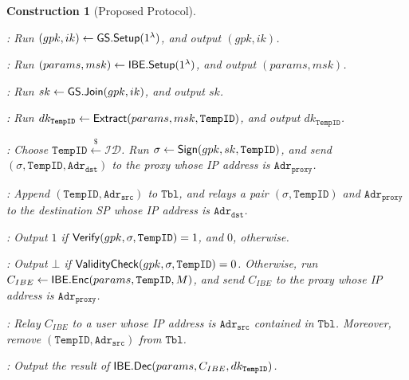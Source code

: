 \documentclass[preprint]{sig-alternate}
\newtheorem{con}{Construction}[section]
\begin{document}
\begin{con}[Proposed Protocol]~
\begin{description}
\setlength{\itemsep}{0em}\setlength{\parsep}{0em}
\item[${\sf GM.Setup}$]: Run $(gpk,ik)\leftarrow{\sf GS.Setup}(1^\lambda)$, and output $(gpk,\allowbreak ik)$. 

\item[${\sf KGC.Setup}$]: Run $(params,msk)\leftarrow{\sf IBE.Setup}(1^\lambda)$, and output $(params,msk)$. 

\item[${\sf Join}$]: Run $sk\leftarrow {\sf GS.Join}(gpk,ik)$, and output $sk$. 

\item[${\sf UserKeyGen}$]: Run $dk_{\mathtt{TempID}}\leftarrow{\sf Extract}(params,msk,\mathtt{TempID})$, 
and output $dk_{\mathtt{TempID}}$. 

\item[${\sf SendRequest}$]: Choose $\mathtt{TempID}\stackrel{\$}{\leftarrow} \mathcal{ID}$. Run $\sigma\leftarrow {\sf Sign}(gpk,sk,\allowbreak \mathtt{TempID})$, and send $(\sigma,\mathtt{TempID},\mathtt{Adr_{dst}})$ to the proxy whose IP address is $\mathtt{Adr_{proxy}}$. 

\item[${\sf RelayRequest}$]: Append $(\mathtt{TempID},\mathtt{Adr_{src}})$ to $\mathtt{Tbl}$, and relays a pair $(\sigma,\mathtt{TempID})$ and $\mathtt{Adr_{proxy}}$ to the destination SP whose IP address is $\mathtt{Adr_{dst}}$. 

\item[${\sf ValidityCheck}$]: Output $1$ if ${\sf Verify}(gpk,\sigma,\mathtt{TempID})=1$, and $0$, otherwise. 

\item[${\sf SendContent}$]: Output $\bot$ if ${\sf ValidityCheck}(gpk,\sigma,\mathtt{TempID})=0$. Otherwise, run $C_{IBE}\leftarrow {\sf IBE.Enc}(params,\mathtt{TempID},\allowbreak M)$, and send $C_{IBE}$ to the proxy whose IP address is $\mathtt{Adr_{proxy}}$. 

\item[${\sf RelayContent}$]: Relay $C_{IBE}$ to a user whose IP address is $\mathtt{Adr_{src}}$ contained in $\mathtt{Tbl}$. Moreover, remove $(\mathtt{TempID}, \allowbreak \mathtt{Adr_{src}})$ from $\mathtt{Tbl}$. 



\item[${\sf GetContent}$]: Output the result of ${\sf IBE.Dec}(params,C_{IBE},\allowbreak dk_{\mathtt{TempID}} )$. 
\end{description}
\end{con}
\end{document}
